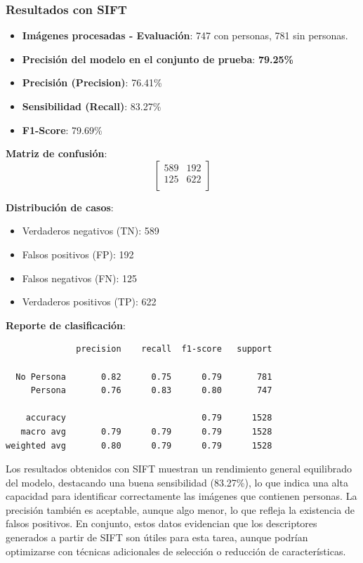 \documentclass[a4paper]{article}
\begin{document}
\subsubsection*{Resultados con SIFT}

\begin{itemize}
    \item \textbf{Imágenes procesadas - Evaluación}: 747 con personas, 781 sin personas.
    \item \textbf{Precisión del modelo en el conjunto de prueba}: \textbf{79.25\%}
    \item \textbf{Precisión (Precision)}: 76.41\%
    \item \textbf{Sensibilidad (Recall)}: 83.27\%
    \item \textbf{F1-Score}: 79.69\%
\end{itemize}

\textbf{Matriz de confusión}:
\[
\begin{bmatrix}
589 & 192 \\
125 & 622 \\
\end{bmatrix}
\]

\textbf{Distribución de casos}:
\begin{itemize}
    \item Verdaderos negativos (TN): 589
    \item Falsos positivos (FP): 192
    \item Falsos negativos (FN): 125
    \item Verdaderos positivos (TP): 622
\end{itemize}

\textbf{Reporte de clasificación}:

\begin{verbatim}
              precision    recall  f1-score   support

  No Persona       0.82      0.75      0.79       781
     Persona       0.76      0.83      0.80       747

    accuracy                           0.79      1528
   macro avg       0.79      0.79      0.79      1528
weighted avg       0.80      0.79      0.79      1528
\end{verbatim}

Los resultados obtenidos con SIFT muestran un rendimiento general equilibrado del modelo, destacando una buena sensibilidad (83.27\%), lo que indica una alta capacidad para identificar correctamente las imágenes que contienen personas. La precisión también es aceptable, aunque algo menor, lo que refleja la existencia de falsos positivos. En conjunto, estos datos evidencian que los descriptores generados a partir de SIFT son útiles para esta tarea, aunque podrían optimizarse con técnicas adicionales de selección o reducción de características.
\end{document}
